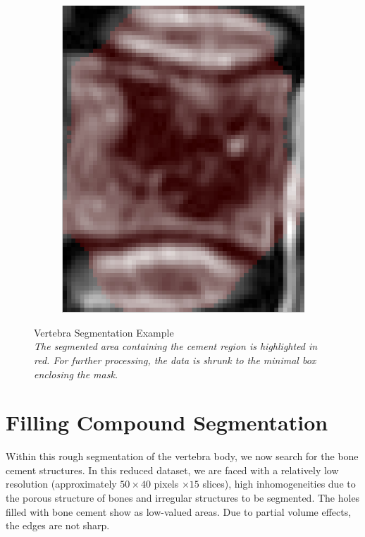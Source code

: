 \documentclass{article}
\begin{document}
{\begin{figure}[h]
\begin{subfigure}[t]{0.45\linewidth}
      \end{subfigure}
      \hfill
      \begin{subfigure}[t]{0.45\linewidth}
        \centering
        \includegraphics[scale=0.4]{VertebraSegmentationExample_2.png}
      \end{subfigure}
      \caption{Vertebra Segmentation Example\\
        \textit{The segmented area containing the cement region is highlighted in red. For further processing, the data is shrunk to the minimal box enclosing the mask.}}
    \end{figure} 
  }	
  
  \section{Filling Compound Segmentation}
  
  Within this rough segmentation of the vertebra body, we now search for the bone cement structures.
  In this reduced dataset, we are faced with a relatively low resolution (approximately $50 \times 40$ pixels $\times 15$ slices), high inhomogeneities due to the porous structure of bones and irregular structures to be segmented.
  The holes filled with bone cement show as low-valued areas.
  Due to partial volume effects, the edges are not sharp. 
  
\end{document}
